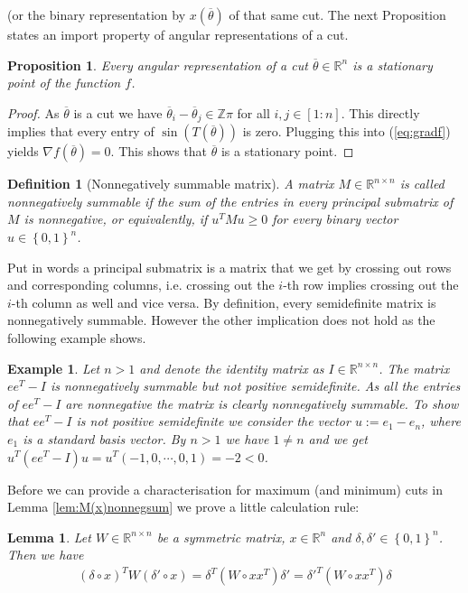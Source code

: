 \documentclass[12pt,a4paper]{article}
\theoremstyle{mythm}
\newtheorem{Def}[thm]{Definition}
\newtheorem{prop}[thm]{Proposition}
\newtheorem{lem}[thm]{Lemma}
\newtheorem*{exa}{Example}
\begin{document}
(or the binary representation by $ x ( \overline{ \theta } ) $ of that same cut.
The next Proposition states an import property of angular representations of a cut.
\begin{prop}
\label{prop:cutsArestationaryPoints} 
Every angular representation of a cut $ \overline{ \theta } \in \mathbb{R} ^{ n }  $ is a stationary point of the function $ f $.
\end{prop} 
\begin{proof}
As $ \overline{ \theta } $ is a cut we have $ \overline{ \theta } _{ i } - \overline{ \theta } _{ j } \in \mathbb{Z} \pi  $ for all $ i,j \in \left[ 1:n \right]  $. 
This directly implies that every entry of $ \sin( T ( \overline{ \theta } ) )  $ is zero. Plugging this into (\ref{eq:gradf}) yields $ \nabla f ( \overline{ \theta } ) = 0$.
This shows that $ \overline{ \theta }  $ is a stationary point.
\end{proof}
\begin{Def}[Nonnegatively summable matrix]
A matrix $ M \in \mathbb{R} ^{ n \times n }  $ is called nonnegatively summable if the sum of the entries in every principal submatrix of $ M $ is nonnegative, or
equivalently, if $ u ^{ T} M u \geq 0    $ for every binary vector $ u \in \left\{ 0,1 \right\} ^{ n }  $.
\end{Def} 
Put in words a principal submatrix is a matrix that we get by crossing out rows and corresponding columns, i.e. crossing out the $ i$-th row implies crossing out the $ i
$-th column as well and vice versa.
By definition, every semidefinite matrix is nonnegatively summable. However the other implication does not hold as the following example shows.
\begin{exa}
Let $ n>1 $ and denote the identity matrix as $ I \in \mathbb{R} ^{ n \times n }  $.
The matrix $ ee^T - I $ is nonnegatively summable but not positive semidefinite.
As all the entries of $ ee^T - I $ are nonnegative the matrix is clearly nonnegatively summable.
To show that $ ee^T - I $ is not positive semidefinite we consider the vector $ u := e_1 - e_n $, where $ e_1 $ is a standard basis vector. By $ n>1  $ we have $ 1 \neq n  $ and we get 
$ u ^T \left( ee^T - I \right) u = u^T \left( -1,0, \cdots, 0,1 \right) = -2 < 0  $.
\end{exa} 
Before we can provide a characterisation for maximum (and minimum) cuts in Lemma \ref{lem:M(x)nonnegsum} we prove a little calculation rule:
\begin{lem}
\label{lem:calcrule} 
Let $ W \in \mathbb{R} ^{ n \times n }  $ be a symmetric matrix, $ x \in \mathbb{R} ^{ n } $ and $ \delta,  \delta ' \in \left\{ 0,1 \right\} ^{ n }  $.
Then we have
\begin{align*}
\left( \delta \circ x \right) ^T W \left(  \delta '  \circ x \right) = \delta ^T \left( W \circ x x ^T  \right)  \delta ' =  \delta '^T \left( W \circ x x ^T  \right) \delta
\end{align*} 
\end{lem} 
\end{document}
